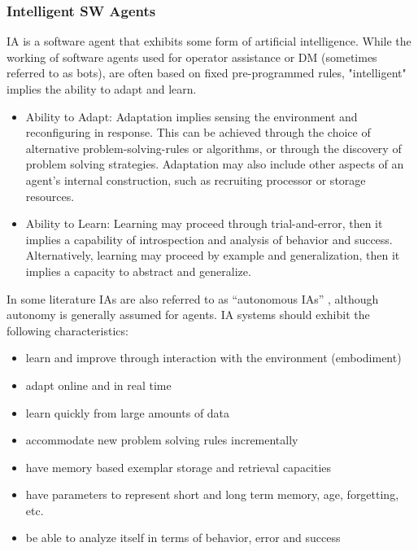 \documentclass[12pt,a4paper,final,twoside,onecolumn,titlepage]{book}
\begin{document}
\subsubsection{Intelligent SW Agents}
\gls{IA} is a software agent that exhibits some form of artificial intelligence. While the working of software agents used for operator assistance or \gls{DM} (sometimes referred to as bots), are often based on fixed pre-programmed rules, "intelligent" implies the ability to adapt and learn.
\begin{itemize}
\item Ability to Adapt: Adaptation implies sensing the environment and reconfiguring in response. This can be achieved through the choice of alternative problem-solving-rules or algorithms, or through the discovery of problem solving strategies. Adaptation may also include other aspects of an agent's internal construction, such as recruiting processor or storage resources.
\item Ability to Learn: Learning may proceed through trial-and-error, then it implies a capability of introspection and analysis of behavior and success. Alternatively, learning may proceed by example and generalization, then it implies a capacity to abstract and generalize.
\end{itemize}
In some literature IAs are also referred to as “autonomous \gls{IA}s” \cite{R39}, although autonomy is generally assumed for agents. IA systems should exhibit the following characteristics:
\begin{itemize}
\item learn and improve through interaction with the environment (embodiment)
\item adapt online and in real time
\item learn quickly from large amounts of data
\item accommodate new problem solving rules incrementally
\item have memory based exemplar storage and retrieval capacities
\item have parameters to represent short and long term memory, age, forgetting, etc.
\item be able to analyze itself in terms of behavior, error and success
\end{itemize}
\end{document}
